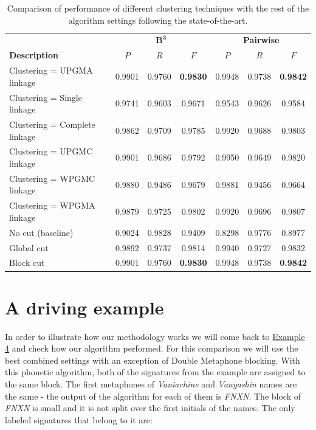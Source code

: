 \documentclass{pracamgr}
\begin{document}
\begin{table}[H]
\caption{Comparison of performance of different clustering techniques with
the rest of the algorithm settings following the state-of-the-art.}
\centering
\begin{tabular}{|l|c c c | c c c|}
  \hline
                       & \multicolumn{3}{c|}{$\mathbf{B^{3}}$} & \multicolumn{3}{c|}{\textbf{Pairwise}}\\
  \textbf{Description} & $P$ & $R$ & $F$ & $P$ & $R$ & $F$ \\
  \hline
\hline
Clustering = UPGMA linkage & 0.9901 & 0.9760 & \textbf{0.9830}  & 0.9948 & 0.9738 & \textbf{0.9842} \\
Clustering = Single linkage & 0.9741 & 0.9603 & 0.9671  & 0.9543 & 0.9626 & 0.9584 \\
Clustering = Complete linkage & 0.9862 & 0.9709 & 0.9785  & 0.9920 & 0.9688 & 0.9803 \\
Clustering = UPGMC linkage & 0.9901 & 0.9686 & 0.9792 & 0.9950 & 0.9649 & 0.9820 \\
Clustering = WPGMC linkage & 0.9880 & 0.9486 & 0.9679 & 0.9881 & 0.9456 & 0.9664 \\
Clustering = WPGMA linkage & 0.9879 & 0.9725 & 0.9802 & 0.9920 & 0.9696 & 0.9807 \\
\hline
No cut (baseline) & 0.9024 & 0.9828 & 0.9409  & 0.8298 & 0.9776 & 0.8977 \\
Global cut & 0.9892 & 0.9737 & 0.9814  & 0.9940 & 0.9727 & 0.9832 \\
Block cut & 0.9901 & 0.9760 & \textbf{0.9830}  & 0.9948 & 0.9738 & \textbf{0.9842} \\
\hline
\end{tabular}
\label{tab:14}
\end{table}

\section{A driving example}

In order to illustrate how our methodology works we will come back to \hyperref[ex4]{Example 4}
and check how our algorithm performed. For this comparison we will use the best combined settings
with an exception of Double Metaphone blocking. With this phonetic algorithm,
both of the signatures from the example are assigned
to the same block. The first metaphones of \textit{Vaniachine} and \textit{Vanyashin} names are the
same - the output of the algorithm for each of them is \textit{FNXN}. The block of \textit{FNXN}
is small and it is not split over the first initials of the names. The only labeled signatures that
belong to it are:
\end{document}
